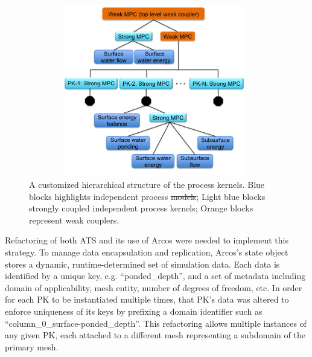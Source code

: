 \documentclass[review,11pt]{elsarticle}
\newcommand{\newtext}[1]{{\color{blue}{#1}}} %
\providecommand{\DIFadd}[1]{{\protect\color{blue}\uwave{#1}}} %
\providecommand{\DIFdel}[1]{{\protect\color{red}\sout{#1}}}                      %
\providecommand{\DIFaddFL}[1]{\DIFadd{#1}} %
\providecommand{\DIFdelFL}[1]{\DIFdel{#1}} %
\providecommand{\DIFaddbeginFL}{} %
\providecommand{\DIFaddendFL}{} %
\providecommand{\DIFdelbeginFL}{} %
\providecommand{\DIFdelendFL}{} %
\begin{document}
\begin{figure}[!htpb]
\centering
\includegraphics[height = 7.5cm, width=11cm]{figures/process-tree1.png}
\caption{A customized hierarchical structure of the process kernels. Blue blocks highlights independent process \DIFdelbeginFL \DIFdelFL{models}\DIFdelendFL \DIFaddbeginFL \DIFaddFL{kernels}\DIFaddendFL ; Light blue blocks strongly coupled independent process kernels; Orange blocks represent weak couplers. \DIFaddbeginFL \newtext{Multiprocess Coordinator (MPC) highlighted by the light blue blocks couple the lower level PKs. A Process Kernel in the lower levels represents a single partial differential equation.}\DIFaddendFL }
\label{pk-tree}
\end{figure}

Refactoring of both ATS and its use of Arcos were needed to implement this strategy.
To manage data encapsulation and replication, Arcos's state object stores a dynamic, runtime-determined set of simulation data.
Each data is identified by a unique key, e.g. ``ponded\_depth'', and a set of metadata including domain of applicability, mesh entity, number of degrees of freedom, etc.
In order for each PK to be instantiated multiple times, that PK's data was altered to enforce uniqueness of its keys by prefixing a domain identifier such as ``column\_0\_surface-ponded\_depth''.
This refactoring allows multiple instances of any given PK, each attached to a different mesh representing a subdomain of the primary mesh.
\end{document}
